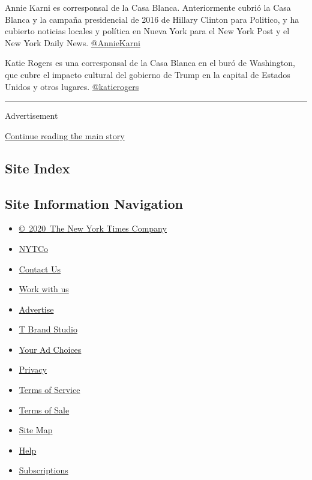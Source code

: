 Annie Karni es corresponsal de la Casa Blanca. Anteriormente cubrió la
Casa Blanca y la campaña presidencial de 2016 de Hillary Clinton para
Politico, y ha cubierto noticias locales y política en Nueva York para
el New York Post y el New York Daily News.
\href{https://twitter.com/AnnieKarni}{@AnnieKarni}

Katie Rogers es una corresponsal de la Casa Blanca en el buró de
Washington, que cubre el impacto cultural del gobierno de Trump en la
capital de Estados Unidos y otros lugares.
\href{https://twitter.com/katierogers}{@katierogers}

\begin{center}\rule{0.5\linewidth}{\linethickness}\end{center}

Advertisement

\protect\hyperlink{after-bottom}{Continue reading the main story}

\hypertarget{site-index}{%
\subsection{Site Index}\label{site-index}}

\hypertarget{site-information-navigation}{%
\subsection{Site Information
Navigation}\label{site-information-navigation}}

\begin{itemize}
\tightlist
\item
  \href{https://help.nytimes.com/hc/en-us/articles/115014792127-Copyright-notice}{©~2020~The
  New York Times Company}
\end{itemize}

\begin{itemize}
\tightlist
\item
  \href{https://www.nytco.com/}{NYTCo}
\item
  \href{https://help.nytimes.com/hc/en-us/articles/115015385887-Contact-Us}{Contact
  Us}
\item
  \href{https://www.nytco.com/careers/}{Work with us}
\item
  \href{https://nytmediakit.com/}{Advertise}
\item
  \href{http://www.tbrandstudio.com/}{T Brand Studio}
\item
  \href{https://www.nytimes.com/privacy/cookie-policy\#how-do-i-manage-trackers}{Your
  Ad Choices}
\item
  \href{https://www.nytimes.com/privacy}{Privacy}
\item
  \href{https://help.nytimes.com/hc/en-us/articles/115014893428-Terms-of-service}{Terms
  of Service}
\item
  \href{https://help.nytimes.com/hc/en-us/articles/115014893968-Terms-of-sale}{Terms
  of Sale}
\item
  \href{https://spiderbites.nytimes.com}{Site Map}
\item
  \href{https://help.nytimes.com/hc/en-us}{Help}
\item
  \href{https://www.nytimes.com/subscription?campaignId=37WXW}{Subscriptions}
\end{itemize}
